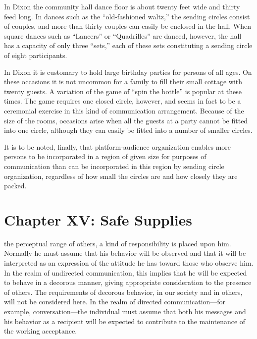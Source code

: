 \documentclass[openany,nobib]{tufte-book}
\let\oldchapter\chapter
\def\chapter{%
  \setcounter{footnote}{0}%
  \oldchapter
}
\begin{document}
In Dixon the community hall dance floor is about twenty feet wide and
thirty feed long. In dances such as the ``old-fashioned waltz,'' the
sending circles consist of couples, and more than thirty couples can
easily be enclosed in the hall. When square dances such as ``Lancers''
or ``Quadrilles'' are danced, however, the hall has a capacity of only
three ``sets,'' each of these sets constituting a sending circle of
eight participants.

In Dixon it is customary to hold large birthday parties for persons of
all ages. On these occasions it is not uncommon for a family to fill
their small cottage with twenty guests. A variation of the game of
``spin the bottle'' is popular at these times. The game requires one
closed circle, however, and seems in fact to be a ceremonial exercise in
this kind of communication arrangement. Because of the size of the
rooms, occasions arise when all the guests at a party cannot be fitted
into one circle, although they can easily be fitted into a number of
smaller circles.

It is to be noted, finally, that platform-audience organization enables
more persons to be incorporated in a region of given size for purposes
of communication than can be incorporated in this region by sending
circle organization, regardless of how small the circles are and how
closely they are packed.


\chapter[CHAPTER XV: SAFE SUPPLIES]{Chapter XV: Safe Supplies}
\label{ch:Chapter XV: Safe Supplies}

the perceptual range of others, a kind of
responsibility is placed upon him. Normally he must assume that his
behavior will be observed and that it will be interpreted as an
expression of the attitude he has toward those who observe him. In the
realm of undirected communication, this implies that he will be expected
to behave in a decorous manner, giving appropriate consideration to the
presence of others. The requirements of decorous behavior, in our
society and in others, will not be considered here. In the realm of
directed communication---for example, conversation---the individual must
assume that both his messages and his behavior as a recipient will be
expected to contribute to the maintenance of the working acceptance.
\end{document}
